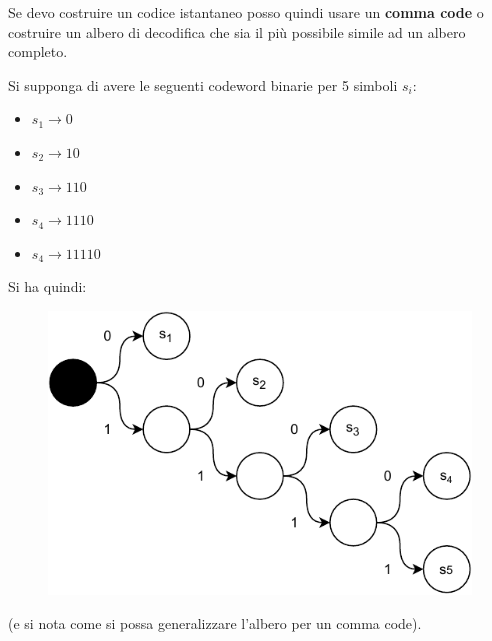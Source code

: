 \documentclass[a4paper,12pt, oneside]{book}
\begin{document}
Se devo costruire un codice istantaneo posso quindi usare un \textbf{comma code}
o costruire un albero di decodifica che sia il più possibile simile ad un albero
completo.
\begin{esempio}
  Si supponga di avere le seguenti codeword binarie per 5 simboli $s_i$:
  \begin{itemize}
    \item $s_1\to 0$
    \item $s_2\to 10$
    \item $s_3\to 110$
    \item $s_4\to 1110$
    \item $s_4\to 11110$
  \end{itemize}
  Si ha quindi:
   \begin{figure}[H]
    \centering
    \includegraphics[scale = 0.8]{img/ct3.pdf}
  \end{figure}
  (e si nota come si possa generalizzare l'albero per un comma code).
\end{esempio}
\end{document}
